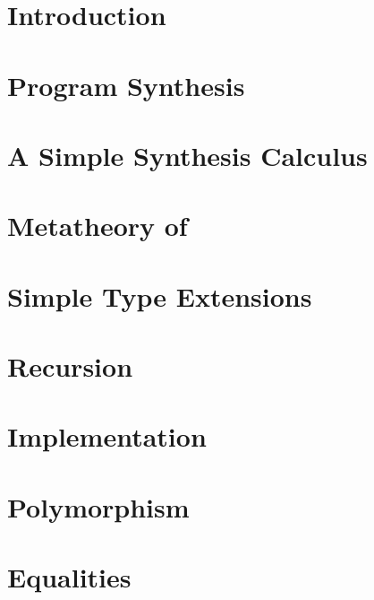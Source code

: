 \chapter{Introduction}
\label{ch:introduction}


\chapter{Program Synthesis}
\label{ch:program-synthesis}


\chapter{A Simple Synthesis Calculus}
\label{ch:a-simple-synthesis-calculus}


\chapter{Metatheory of \texorpdfstring{\lsyn{}}{λsyn}}
\label{ch:metatheory-of-lsyn}


\chapter{Simple Type Extensions}
\label{ch:simple-type-extensions}


\chapter{Recursion}
\label{ch:recursion}


\chapter{Implementation}
\label{ch:implementation}


\chapter{Polymorphism}
\label{ch:polymorphism}


\chapter{Equalities}
\label{ch:equalities}


